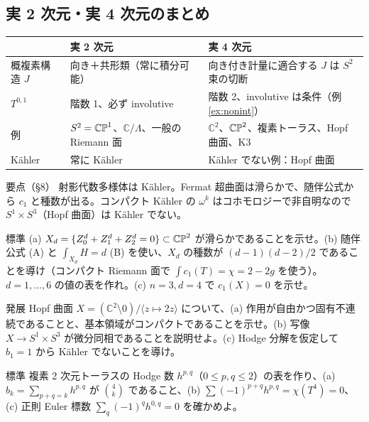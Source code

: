 \subsection{実 2 次元・実 4 次元のまとめ}
\begin{center}
\begin{tabular}{p{}p{}p{}}
\toprule
& 実 2 次元 & 実 4 次元\\
\midrule
概複素構造 $J$ & 向き＋共形類（常に積分可能） & 向き付き計量に適合する $J$ は $S^2$ 束の切断\\
$T^{0,1}$ & 階数 1、必ず involutive & 階数 2、involutive は条件（例 \ref{ex:nonint}）\\
例 & $S^2=\mathbb{CP}^1$、$\mathbb C/\Lambda$、一般の Riemann 面 & $\mathbb C^2$、$\mathbb{CP}^2$、複素トーラス、Hopf 曲面、K3\\
Kähler & 常に Kähler & Kähler でない例：Hopf 曲面\\
\bottomrule
\end{tabular}
\end{center}

\begin{keybox}{要点（§8）}
射影代数多様体は Kähler。Fermat 超曲面は滑らかで、随伴公式から $c_1$ と種数が出る。コンパクト Kähler の $\omega^k$ はコホモロジーで非自明なので $S^1\times S^3$（Hopf 曲面）は Kähler でない。
\end{keybox}

\begin{prob}{標準}\label{p:fermat}
(a) $X_d=\{Z_0^d+Z_1^d+Z_2^d=0\}\subset\mathbb{CP}^2$ が滑らかであることを示せ。(b) 随伴公式 (A) と $\int_{X_d}H=d$ (B) を使い、$X_d$ の種数が $(d-1)(d-2)/2$ であることを導け（コンパクト Riemann 面で $\int c_1(T)=\chi=2-2g$ を使う）。$d=1,\dots,6$ の値の表を作れ。(c) $n=3,d=4$ で $c_1(X)=0$ を示せ。
\end{prob}
\begin{prob}{発展}\label{p:hopf}
Hopf 曲面 $X=(\mathbb C^2\setminus0)/\langle z\mapsto2z\rangle$ について、(a) 作用が自由かつ固有不連続であることと、基本領域がコンパクトであることを示せ。(b) 写像 $X\to S^1\times S^3$ が微分同相であることを説明せよ。(c) Hodge 分解を仮定して $b_1=1$ から Kähler でないことを導け。
\end{prob}
\begin{prob}{標準}\label{p:torus2}
複素 2 次元トーラスの Hodge 数 $h^{p,q}$（$0\le p,q\le2$）の表を作り、(a) $b_k=\sum_{p+q=k}h^{p,q}$ が $\binom4k$ であること、(b) $\sum(-1)^{p+q}h^{p,q}=\chi(T^4)=0$、(c) 正則 Euler 標数 $\sum_q(-1)^qh^{0,q}=0$ を確かめよ。
\end{prob}

